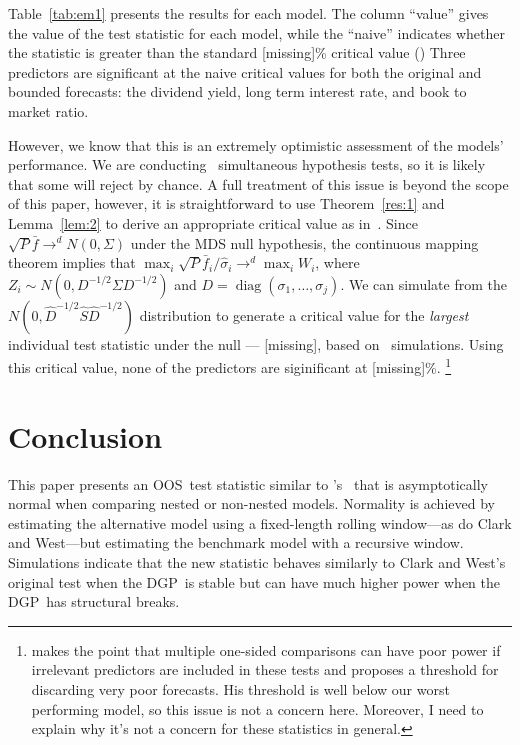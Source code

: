 \documentclass[12pt,fleqn]{article}
\newcommand\poscw{\citeauthor{ClW:06}'s \citeyearpar{ClW:06,ClW:07}}
\providecommand\bootsize{[missing]}
\providecommand\empiricalcriticalvalue{[missing]}
\theoremstyle{definition}
\DeclareMathOperator{\diag}{diag}
\newcommand{\fb}{\bar{f}}
\newcommand{\Sh}{\hat{S}}
\newcommand{\sh}{\hat\sigma}
\newcommand{\dgp}{DGP}
\newcommand{\oos}{OOS}
\begin{document}
Table~\ref{tab:em1} presents the results for each model.  The column
``value'' gives the value of the test statistic for each model, while
the ``naive'' indicates whether the statistic is greater than the
standard \bootsize\% critical value (\naivecriticalvalue) Three
predictors are
significant at the naive critical values for both the original and
bounded forecasts: the dividend yield, long term interest rate, and
book to market ratio.

However, we know that this is an extremely optimistic assessment of
the models' performance. We are conducting \nmod\ simultaneous
hypothesis tests, so it is likely that some will reject by chance. A
full treatment of this issue is beyond the scope of this paper,
however, it is straightforward to use Theorem~\ref{res:1} and
Lemma~\ref{lem:2} to derive an appropriate critical value as
in~\citet{Whi:00}. Since $\sqrt{P} \fb \to^d N(0, \Sigma)$ under
the MDS null hypothesis, the continuous mapping theorem implies that
$\max_i \sqrt{P} \fb_i/\sh_i \to^d \max_i W_i$, where $Z_i
\sim N(0, D^{-1/2} \Sigma D^{-1/2})$ and $D = \diag(\sigma_1, \dots,
\sigma_j)$. We can simulate from the $N(0, \hat D^{-1/2} \Sh
\hat D^{-1/2})$ distribution to generate a critical value for the
\emph{largest} individual test statistic under the null ---
\empiricalcriticalvalue, based on \empiricaldraws\ simulations. Using
this critical value, none of the predictors are siginificant at
\bootsize\%.%
\footnote{\citet{Han:05} makes the point that multiple one-sided
  comparisons can have poor power if irrelevant predictors are
  included in these tests and proposes a threshold for discarding very
  poor forecasts. His threshold is well below our worst performing
  model, so this issue is not a concern here. Moreover, I need to
  explain why it's not a concern for these statistics in general.} %

\section{Conclusion}\label{sec:4}
This paper presents an \oos\ test statistic similar to \poscw\ that is
asymptotically normal when comparing nested or non-nested models.
Normality is achieved by estimating the alternative model using a
fixed-length rolling window---as do Clark and West---but estimating
the benchmark model with a recursive window.  Simulations indicate
that the new statistic behaves similarly to Clark and West's original
test when the \dgp\ is stable but can have much higher power when the 
\dgp\ has structural breaks.
\end{document}
